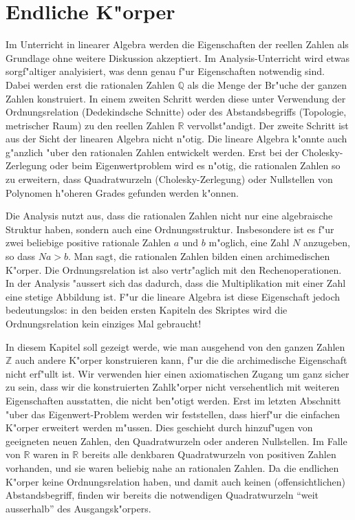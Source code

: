 %
%
%
\section{Endliche K"orper}
Im Unterricht in linearer Algebra werden die Eigenschaften der reellen
Zahlen als Grundlage ohne weitere Diskussion akzeptiert.
Im Analysis-Unterricht wird etwas sorgf"altiger analyisiert, was denn
genau f"ur Eigenschaften notwendig sind.
Dabei werden erst die rationalen Zahlen $\mathbb Q$ als die Menge der
Br"uche der ganzen Zahlen konstruiert.
In einem zweiten Schritt werden diese unter Verwendung der Ordnungsrelation
(Dedekindsche Schnitte)
oder des Abstandsbegriffs (Topologie, metrischer Raum) zu den reellen
Zahlen $\mathbb R$ vervollst"andigt.
Der zweite Schritt ist aus der Sicht der linearen Algebra nicht n"otig.
Die lineare Algebra k"onnte auch g"anzlich "uber den rationalen Zahlen
entwickelt werden.
Erst bei der Cholesky-Zerlegung oder beim Eigenwertproblem wird es
n"otig, die rationalen Zahlen so zu erweitern, dass Quadratwurzeln
(Cholesky-Zerlegung) oder Nullstellen von Polynomen h"oheren Grades
gefunden werden k"onnen.

Die Analysis nutzt aus, dass die rationalen Zahlen nicht nur eine algebraische
Struktur haben, sondern auch eine Ordnungsstruktur.
Insbesondere ist es f"ur zwei beliebige positive rationale Zahlen
$a$ und $b$ m"oglich, eine Zahl $N$ anzugeben, so dass $Na>b$.
Man sagt, die rationalen Zahlen bilden einen archimedischen K"orper.
Die Ordnungsrelation ist also vertr"aglich mit den Rechenoperationen.
In der Analysis "aussert sich das dadurch, dass die Multiplikation mit
einer Zahl eine stetige Abbildung ist.
F"ur die lineare Algebra ist diese Eigenschaft jedoch bedeutungslos:
in den beiden ersten Kapiteln des Skriptes wird die Ordnungsrelation
kein einziges Mal gebraucht!

In diesem Kapitel soll gezeigt werde, wie man ausgehend von den
ganzen Zahlen $\mathbb Z$ auch andere K"orper konstruieren kann,
f"ur die die archimedische Eigenschaft nicht erf"ullt ist.
Wir verwenden hier einen axiomatischen Zugang um ganz sicher zu sein,
dass wir die konstruierten Zahlk"orper nicht versehentlich mit weiteren
Eigenschaften ausstatten, die nicht ben"otigt werden.
Erst im letzten Abschnitt "uber das Eigenwert-Problem werden wir
feststellen, dass hierf"ur die einfachen K"orper erweitert werden
m"ussen.
Dies geschieht durch hinzuf"ugen von geeigneten neuen Zahlen, den
Quadratwurzeln oder anderen Nullstellen.
Im Falle von $\mathbb R$ waren in $\mathbb R$ bereits alle denkbaren
Quadratwurzeln von positiven Zahlen vorhanden, und sie waren beliebig
nahe an rationalen Zahlen.
Da die endlichen K"orper keine Ordnungsrelation haben, und damit auch
keinen (offensichtlichen) Abstandsbegriff, finden wir bereits die
notwendigen Quadratwurzeln ``weit ausserhalb'' des Ausgangsk"orpers.

